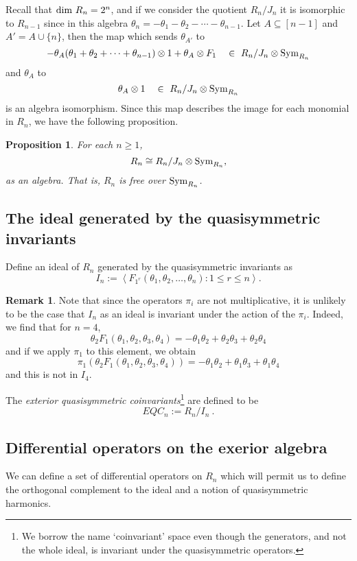 \documentclass[11pt,oneside]{amsart}
\newtheorem{prop}[theorem]{Proposition}
\theoremstyle{definition}
\newtheorem{remark}[theorem]{Remark}
\numberwithin{equation}{section}
\begin{document}
Recall that ${\rm dim}~R_n = 2^n$,
and if we consider the quotient $R_n/J_n$ it is isomorphic to $R_{n-1}$ since
in this algebra $\theta_n = - \theta_1 -\theta_2 - \cdots - \theta_{n-1}$.
Let $A \subseteq [n-1]$ and $A' = A \cup \{n\}$, then
the map which sends
$\theta_{A'}$ to
$$-\theta_{A}(\theta_1 + \theta_2 + \cdots + \theta_{n-1}) \otimes 1
+ \theta_{A} \otimes F_1\quad \in\ R_n/J_n \otimes {\rm Sym}_{R_n}$$
and $\theta_{A}$ to
$$\theta_{A} \otimes 1 \quad \in \ R_n/J_n \otimes {\rm Sym}_{R_n}$$
is an algebra isomorphism.  Since this map describes the image
for each monomial in $R_n$, we have the following proposition.

\begin{prop} \label{prop:free}
For each $n \geq 1$,
$$R_n \cong R_n/J_n \otimes {\rm Sym}_{R_n},$$
as an algebra.  That is, $R_n$ is free over ${\rm Sym}_{R_n}$.
\end{prop}

\subsection{The ideal generated by the quasisymmetric invariants}

Define an ideal of $R_n$ generated by the quasisymmetric invariants as
\[
I_n := \left< F_{1^r}(\theta_1, \theta_2, \ldots, \theta_n) : 1 \leq r \leq n \right>.
\]

\begin{remark}
Note that since the operators $\pi_i$ are not multiplicative, it
is unlikely to be the case that $I_n$ as an ideal is invariant
under the action of the $\pi_i$.  Indeed, we find that for $n=4$,
\[
\theta_2 F_{1}(\theta_1, \theta_2, \theta_3, \theta_4) =
-\theta_1 \theta_2 + \theta_2 \theta_3 + \theta_2 \theta_4
\]
and if we apply $\pi_1$ to this element, we obtain
\[
\pi_1(\theta_2 F_{1}(\theta_1, \theta_2, \theta_3, \theta_4)) =
-\theta_1 \theta_2 + \theta_1 \theta_3 + \theta_1 \theta_4
\]
and this is not in $I_4$.
\end{remark}

The \emph{exterior quasisymmetric coinvariants}\footnote{We borrow
the name `coinvariant' space even though the generators, and not the whole ideal, is
invariant under the quasisymmetric operators.} are defined to be
\[
EQC_n := R_n/I_n~.
\]


\subsection{Differential operators on the exerior algebra}\label{ssec:harm}
We can define a set of differential operators on $R_n$ which
will permit us to define the orthogonal complement to the
ideal and a notion of quasisymmetric harmonics.
\end{document}
